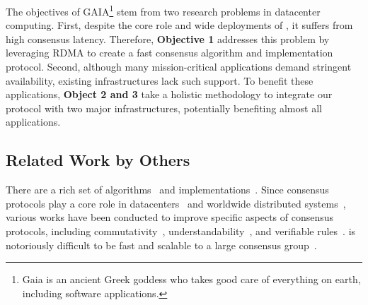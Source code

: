 The objectives of GAIA\footnote{Gaia is an ancient Greek goddess who takes good 
care of everything on earth, including software applications.} stem from two 
research problems in datacenter computing. First, despite the core role and 
wide deployments of \paxos, it suffers from high consensus latency. Therefore, 
\textbf{Objective 1} addresses this problem by leveraging RDMA to create a 
fast consensus algorithm and implementation protocol. Second, although many 
mission-critical applications demand stringent availability, existing 
infrastructures lack such support. To benefit these applications, 
\textbf{Object 2 and 3} take a holistic methodology to integrate our protocol 
with two major infrastructures, potentially benefiting almost all applications.


\subsection{Related Work by Others} 
\label{sec:others-work}\vspace{-.075in}

There are a rich set of \paxos 
algorithms~\cite{paxos:practical,paxos,paxos:simple,paxos:complex,
epaxos:sosp13} 
and implementations~\cite{paxos:live,paxos:practical,chubby:osdi,crane:sosp15}. 
Since consensus protocols play a core role in 
datacenters~\cite{matei:hotcloud11, mesos:nsdi11, 
datacenter:os} and worldwide 
distributed systems~\cite{spanner:osdi12,mencius:osdi08}, various works 
have been conducted to improve specific aspects of consensus protocols, 
including commutativity~\cite{epaxos:sosp13}, 
understandability~\cite{raft:usenix14,paxos}, and verifiable 
rules~\cite{modist:nsdi09,demeter:sosp11}. \paxos is notoriously difficult to be 
fast and scalable to a large consensus 
group~\cite{ellis:thesis,manos:hotdep10,scatter:sosp11}. 


